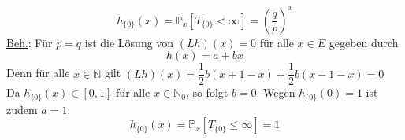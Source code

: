 \begin{equation*}
h_{\lbrace 0 \rbrace}(x) = \mathbb{P}_{x}[T_{\lbrace 0 \rbrace} < \infty] = (\dfrac{q}{p})^{x}
\end{equation*}
\underline{Beh.}: Für $p=q$ ist die Lösung von $(Lh)(x) = 0$ für alle  $x \in E$ gegeben durch 
\begin{equation*}
h(x) = a + bx
\end{equation*}
Denn für alle $x \in \mathbb{N}$ gilt $(Lh)(x) = \dfrac{1}{2}b(x + 1 -x) + \dfrac{1}{2}b(x -1 -x) = 0$
\\
Da $h_{\lbrace 0 \rbrace}(x) \in [0,1]$ für alle $x \in \mathbb{N}_{0}$, so folgt $b=0$. Wegen $h_{\lbrace 0 \rbrace}(0) = 1$ ist zudem $a = 1$:
\begin{equation*}
h_{\lbrace 0 \rbrace}(x) = \mathbb{P}_{x}[T_{\lbrace 0 \rbrace} \leq \infty] = 1
\end{equation*}


